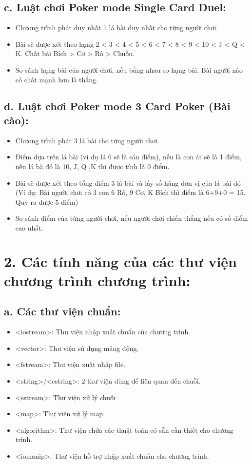 \documentclass{article}
\begin{document}
\subsection{c. Luật chơi Poker mode Single Card Duel:}

\begin{itemize}
    \item Chương trình phát duy nhất 1 lá bài duy nhất cho từng người chơi.
    \item Bài sẽ được xét theo hạng 2 < 3 < 4 < 5 < 6 < 7 < 8 < 9 < 10 < J < Q < K. Chất bài Bích > Cơ > Rô > Chuồn.
    \item So sánh hạng bài của người chơi, nếu bằng nhau so hạng bài. Bài người nào có chất mạnh hơn là thắng.
\end{itemize}

\subsection{d. Luật chơi Poker mode 3 Card Poker (Bài cào):}
\begin{itemize}
    \item Chương trình phát 3 lá bài cho từng người chơi.
    \item Điểm dựa trên lá bài (ví dụ lá 6 sẽ là sáu điểm), nếu là con át sẽ là 1 điểm, nếu lá bà đó là 10, J, Q ,K thì được tính là 0 điểm.
    \item Bài sẽ được xét theo tổng điểm 3 lá bài và lấy số hàng đơn vị của lá bài đó (Ví dụ: Bài người chơi có 3 con 6 Rô, 9 Cơ, K Bích thì điểm là 6+9+0 = 15. Quy ra được 5 điểm)
    \item So sánh điểm của từng người chơi, nếu người chơi chiến thắng nếu có số điểm cao nhất.
\end{itemize}
   
\section{2. Các tính năng của các thư viện chương trình chương trình: }
\subsection{a. Các thư viện chuẩn: }
\begin{itemize}
    \item <iostream>: Thư viện nhập xuất chuẩn của chương trình.
    \item <vector>: Thư viện sử dụng mảng động.
    \item <fstream>: Thư viện xuất nhập file.
    \item <string>/<cstring>: 2 thư viện dùng để liên quan đến chuỗi.
    \item <sstream>: Thư viện xử lý chuỗi
    \item <map>: Thư viện xử lý map
    \item <algorithm>: Thư viện chứa các thuật toán có sẵn cần thiết cho chương trình.
    \item <iomanip>: Thư viện hỗ trợ nhập xuất chuẩn cho chương trình.
    
\end{itemize}
\end{document}
